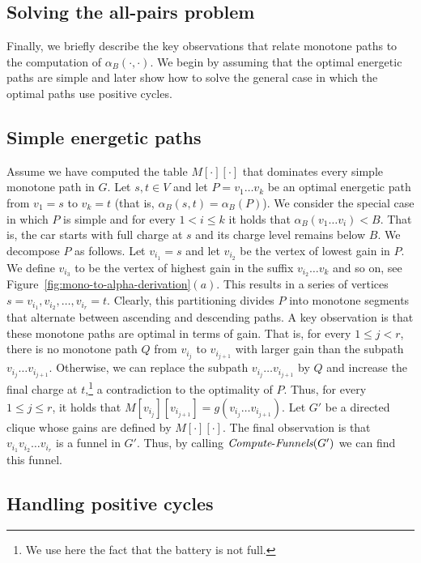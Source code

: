 \documentclass[11pt]{article}
\newcommand{\ComputeF}{\mbox{{\it Compute}-{\it Funnels}}}
\begin{document}
\subsection{Solving the all-pairs problem}
Finally, we briefly describe the key observations that relate monotone paths to the computation of $\alpha_B(\cdot,\cdot)$. We begin by assuming that the optimal energetic paths are simple and later show how to solve the general case in which the optimal paths use positive cycles.

\subsection{Simple energetic paths}\label{sec:technical-review-alpha-of-simple-paths}
Assume we have computed the table $M[\cdot][\cdot]$ that dominates every simple monotone path in $G$.
Let $s,t\in V$ and let $P = v_1\ldots v_k$ be an optimal energetic path from $v_1=s$ to $v_k=t$ (that is, $\alpha_B(s,t) = \alpha_B(P)$). We consider the special case in which $P$ is simple and for every $1 < i\le k$ it holds that $\alpha_B(v_1 \ldots v_i) < B$. That is, the car starts with full charge at $s$ and its charge level remains below $B$.
We decompose $P$ as follows. Let $v_{i_{1}} = s$ and let $v_{i_{2}}$ be the vertex of lowest gain in $P$. We define $v_{i_{3}}$ to be the vertex of highest gain in the suffix $v_{i_{2}}\ldots v_k$ and so on, see Figure~\ref{fig:mono-to-alpha-derivation}$(a)$. This results in a series of vertices $s=v_{i_{1}}, v_{i_{2}},\ldots, v_{i_{r}}=t$. Clearly, this partitioning divides $P$ into monotone segments that alternate between ascending and descending paths. A key observation is that these monotone paths are optimal in terms of gain. That is, for every $1\le j < r$, there is no monotone path $Q$ from $v_{i_{j}}$ to $v_{i_{j+1}}$ with larger gain than the subpath $v_{i_{j}}\ldots v_{i_{j+1}}$. Otherwise, we can replace the subpath $v_{i_{j}}\ldots v_{i_{j+1}}$ by $Q$ and increase the final charge at $t$,\footnote{We use here the fact that the battery is not full.} a contradiction to the optimality of $P$. Thus, for every $1\le j \le r$, it holds that $M[v_{i_{j}}][v_{i_{j+1}}] = g(v_{i_{j}}\ldots v_{i_{j+1}})$. Let $G'$ be a directed clique whose gains are defined by $M[\cdot][\cdot]$. The final observation is that $v_{i_{1}} v_{i_{2}}\ldots v_{i_{r}}$ is a funnel in $G'$. Thus, by calling $\ComputeF(G')$
we can find this funnel.


\subsection{Handling positive cycles}
\end{document}
